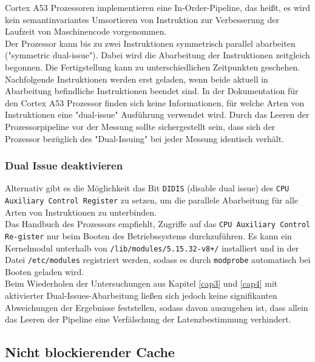 \documentclass[]{scrbook}
\begin{document}
Cortex A53 Prozessoren implementieren eine In-Order-Pipeline, das heißt, es wird kein semantinvariantes Umsortieren von Instruktion zur Verbesserung der Laufzeit von Maschinencode vorgenommen.
\\
Der Prozessor kann bis zu zwei Instruktionen symmetrisch parallel abarbeiten ("symmetric dual-issue"). \cite[S.\,16]{a53trm}
Dabei wird die Abarbeitung der Instruktionen zeitgleich begonnen.
Die Fertigstellung kann zu unterschiedlichen Zeitpunkten geschehen.
Nachfolgende Instruktionen werden erst geladen, wenn beide aktuell in Abarbeitung befindliche Instruktionen beendet sind.
In der Dokumentation für den Cortex A53 Prozessor finden sich keine Informationen, für welche Arten von Instruktionen eine "dual-issue" Ausführung verwendet wird.
Durch das Leeren der Prozessorpipeline vor der Messung sollte sichergestellt sein, dass sich der Prozessor bezüglich des "Dual-Issuing" bei jeder Messung identisch verhält.

\subsubsection{Dual Issue deaktivieren}

Alternativ gibt es die Möglichkeit das Bit \texttt{DIDIS} (disable dual issue) des \texttt{CPU Auxiliary Control Register} zu setzen, um die parallele Abarbeitung für alle Arten von Instruktionen zu unterbinden.
\\
Das Handbuch des Prozessors empfiehlt, Zugriffe auf das \texttt{CPU Auxiliary Control Re-\newline gister} nur beim Booten des Betriebssystems durchzuführen. \cite[S.\,177]{a53trm}
Es kann ein Kernelmodul unterhalb von \texttt{/lib/modules/5.15.32-v8+/} installiert und in der Datei 
\texttt{/etc/modules} registriert werden, sodass es durch \texttt{modprobe} automatisch bei Booten geladen wird. \cite[S.\,335]{lte}
\\
Beim Wiederholen der Untersuchungen aus Kapitel \ref{cap3} und \ref{cap4} mit aktivierter Dual-Issues-Abarbeitung ließen sich jedoch keine signifikanten Abweichungen der Ergebnisse feststellen, sodass davon auszugehen ist, dass allein das Leeren der Pipeline eine Verfälschung der Latenzbestimmung verhindert.

\subsection{Nicht blockierender Cache}
\end{document}
